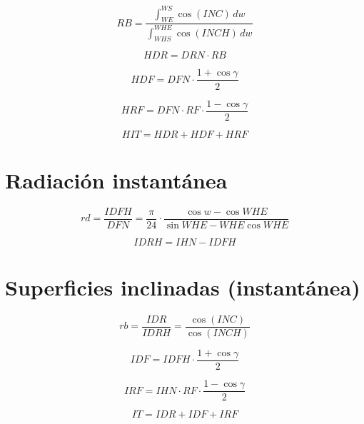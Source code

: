 \documentclass[12pt]{article}
\begin{document}
\begin{equation}
RB = \frac{\int_{WE}^{WS} \cos(INC)\,dw}{\int_{WHS}^{WHE} \cos(INCH)\,dw}
\end{equation}

\begin{equation}
HDR = DRN \cdot RB
\end{equation}

\begin{equation}
HDF = DFN \cdot \frac{1 + \cos\gamma}{2}
\end{equation}

\begin{equation}
HRF = DFN \cdot RF \cdot \frac{1 - \cos\gamma}{2}
\end{equation}

\begin{equation}
HIT = HDR + HDF + HRF
\end{equation}

\section*{Radiación instantánea}

\begin{equation}
rd = \frac{IDFH}{DFN} = \frac{\pi}{24} \cdot \frac{\cos w - \cos WHE}{\sin WHE - WHE \cos WHE}
\end{equation}

\begin{equation}
IDRH = IHN - IDFH
\end{equation}

\section*{Superficies inclinadas (instantánea)}

\begin{equation}
rb = \frac{IDR}{IDRH} = \frac{\cos(INC)}{\cos(INCH)}
\end{equation}

\begin{equation}
IDF = IDFH \cdot \frac{1 + \cos\gamma}{2}
\end{equation}

\begin{equation}
IRF = IHN \cdot RF \cdot \frac{1 - \cos\gamma}{2}
\end{equation}

\begin{equation}
IT = IDR + IDF + IRF
\end{equation}
\end{document}
